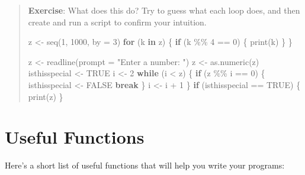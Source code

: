 \documentclass[
  letterpaper,
  DIV=11,
  numbers=noendperiod]{scrreprt}
\newenvironment{Shaded}{\begin{snugshade}}{\end{snugshade}}
\newcommand{\AttributeTok}[1]{\textcolor[rgb]{0.40,0.45,0.13}{#1}}
\newcommand{\ConstantTok}[1]{\textcolor[rgb]{0.56,0.35,0.01}{#1}}
\newcommand{\ControlFlowTok}[1]{\textcolor[rgb]{0.00,0.23,0.31}{\textbf{#1}}}
\newcommand{\DecValTok}[1]{\textcolor[rgb]{0.68,0.00,0.00}{#1}}
\newcommand{\FunctionTok}[1]{\textcolor[rgb]{0.28,0.35,0.67}{#1}}
\newcommand{\NormalTok}[1]{\textcolor[rgb]{0.00,0.23,0.31}{#1}}
\newcommand{\OtherTok}[1]{\textcolor[rgb]{0.00,0.23,0.31}{#1}}
\newcommand{\SpecialCharTok}[1]{\textcolor[rgb]{0.37,0.37,0.37}{#1}}
\newcommand{\StringTok}[1]{\textcolor[rgb]{0.13,0.47,0.30}{#1}}
\begin{document}
\begin{quote}
\textbf{Exercise}: What does this do? Try to guess what each loop does,
and then create and run a script to confirm your intuition.

\begin{Shaded}
\begin{Highlighting}[]
\NormalTok{z }\OtherTok{\textless{}{-}} \FunctionTok{seq}\NormalTok{(}\DecValTok{1}\NormalTok{, }\DecValTok{1000}\NormalTok{, }\AttributeTok{by =} \DecValTok{3}\NormalTok{)}
\ControlFlowTok{for}\NormalTok{ (k }\ControlFlowTok{in}\NormalTok{ z) \{}
  \ControlFlowTok{if}\NormalTok{ (k }\SpecialCharTok{\%\%} \DecValTok{4} \SpecialCharTok{==} \DecValTok{0}\NormalTok{) \{}
     \FunctionTok{print}\NormalTok{(k)}
\NormalTok{  \}}
\NormalTok{\}}
\end{Highlighting}
\end{Shaded}

\begin{Shaded}
\begin{Highlighting}[]
\NormalTok{z }\OtherTok{\textless{}{-}} \FunctionTok{readline}\NormalTok{(}\AttributeTok{prompt =} \StringTok{"Enter a number: "}\NormalTok{)}
\NormalTok{z }\OtherTok{\textless{}{-}} \FunctionTok{as.numeric}\NormalTok{(z)}
\NormalTok{isthisspecial }\OtherTok{\textless{}{-}} \ConstantTok{TRUE}
\NormalTok{i }\OtherTok{\textless{}{-}} \DecValTok{2}
\ControlFlowTok{while}\NormalTok{ (i }\SpecialCharTok{\textless{}}\NormalTok{ z) \{}
  \ControlFlowTok{if}\NormalTok{ (z }\SpecialCharTok{\%\%}\NormalTok{ i }\SpecialCharTok{==} \DecValTok{0}\NormalTok{) \{}
\NormalTok{     isthisspecial }\OtherTok{\textless{}{-}} \ConstantTok{FALSE}
     \ControlFlowTok{break}
\NormalTok{  \}}
\NormalTok{  i }\OtherTok{\textless{}{-}}\NormalTok{ i }\SpecialCharTok{+} \DecValTok{1}
\NormalTok{\}}
\ControlFlowTok{if}\NormalTok{ (isthisspecial }\SpecialCharTok{==} \ConstantTok{TRUE}\NormalTok{) \{}
  \FunctionTok{print}\NormalTok{(z)}
\NormalTok{\}}
\end{Highlighting}
\end{Shaded}
\end{quote}

\section*{Useful Functions}\label{useful-functions}


Here's a short list of useful functions that will help you write your
programs:
\end{document}
